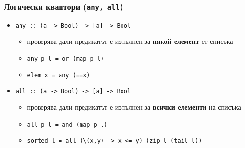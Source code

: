 \documentclass{beamer}
\begin{document}
\begin{frame}
  \frametitle{Логически квантори (\tt{any}, \tt{all})}
  \begin{itemize}[<+->]
  \item \tt{any :: (a -> Bool) -> [a] -> Bool}
    \begin{itemize}
    \item проверява дали предикатът е изпълнен за \textbf{някой елемент} от списъка
    \item \tt{any p l = or (map p l)}
    \item \tt{elem x = any (==x)}
    \end{itemize}
  \item \tt{all :: (a -> Bool) -> [a] -> Bool}
    \begin{itemize}
    \item проверява дали предикатът е изпълнен за \textbf{всички елементи} на списъка
    \item \tt{all p l = and (map p l)}
    \item \tt{sorted l = all (\textbackslash(x,y) -> x <= y) (zip l (tail l))}
    \end{itemize}
  \end{itemize}
\end{frame}
\end{document}

